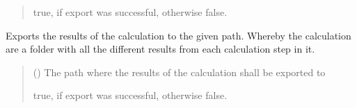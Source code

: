 \documentclass[letterpaper,10pt,english]{sphinxmanual}
\begin{document}
\begin{fulllineitems}
\begin{fulllineitems}
\begin{quote}
\begin{description}
\sphinxAtStartPar
true, if export was successful, otherwise false.

\sphinxAtStartPar
{}

\end{description}\end{quote}

\end{fulllineitems}


\begin{fulllineitems}
\label{\detokenize{apidoc/src.osm_configurator.model.project:src.osm_configurator.model.project.active_project.ActiveProject.export_calculation}}
\pysigstartsignatures
{}
\pysigstopsignatures
\sphinxAtStartPar
Exports the results of the calculation to the given path.
Whereby the calculation are a folder with all the different results from each
calculation step in it.
\begin{quote}\begin{description}
\sphinxAtStartPar
{} () \textendash{} The path where the results of the calculation shall be exported to

\sphinxAtStartPar
true, if export was successful, otherwise false.

\sphinxAtStartPar
{}

\end{description}\end{quote}

\end{fulllineitems}



\end{fulllineitems}
\end{document}
